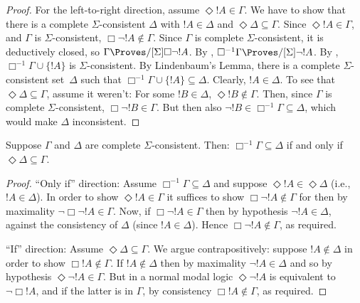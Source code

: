 \documentclass[../../../include/open-logic-section]{subfiles}
\begin{document}
{\begin{proof}
  For the left-to-right direction, assume $\Diamond !A \in \Gamma$. We
  have to show that there is a complete $\Sigma$-consistent $\Delta$
  with $!A \in \Delta$ and $\Diamond\Delta \subseteq \Gamma$.  Since
  $\Diamond !A \in \Gamma$, and $\Gamma$ is $\Sigma$-consistent,
  $\Box\lnot !A \notin \Gamma$. Since $\Gamma$ is complete
  $\Sigma$-consistent, it is deductively closed, so $\Gamma
  \Proves/[\Sigma] \Box\lnot !A$.  By ,
  $\Box^{-1}\Gamma \Proves/[\Sigma] \lnot !A$. By
  ,
  $\Box^{-1}\Gamma \cup \{ !A \}$ is $\Sigma$-consistent. By
  Lindenbaum's Lemma, there is a complete $\Sigma$-consistent
  set~$\Delta$ such that $\Box^{-1}\Gamma \cup \{ !A \} \subseteq
  \Delta$. Clearly, $!A \in \Delta$.  To see that $\Diamond\Delta
  \subseteq \Gamma$, assume it weren't: For some $!B \in \Delta$,
  $\Diamond !B \notin \Gamma$. Then, since $\Gamma$ is complete
  $\Sigma$-consistent, $\Box\lnot !B \in \Gamma$. But then also $\lnot
  !B \in \Box^{-1}\Gamma \subseteq \Delta$, which would make $\Delta$
  inconsistent.
\end{proof}
}

\begin{lem}
  Suppose $\Gamma$ and $\Delta$ are complete
  $\Sigma$-consistent. Then: $\Box^{-1}\Gamma \subseteq \Delta$ if and
  only if $\Diamond\Delta \subseteq \Gamma$.
\end{lem}

\begin{proof}
  ``Only if'' direction: Assume $\Box^{-1}\Gamma \subseteq \Delta$ and
  suppose $\Diamond!A \in \Diamond\Delta$ (i.e., $!A \in \Delta$).  In
  order to show $\Diamond!A \in \Gamma$ it suffices to show
  $\Box\lnot!A \notin \Gamma$ for then by maximality $\lnot\Box\lnot
  !A \in \Gamma$. Now, if $\Box\lnot!A \in \Gamma$ then by hypothesis
  $\lnot!A \in \Delta$, against the consistency of $\Delta$ (since $!A
  \in \Delta$). Hence $\Box\lnot!A \notin \Gamma$, as required.

  ``If'' direction: Assume $\Diamond\Delta
  \subseteq \Gamma$. We argue contrapositively: suppose $!A
  \notin \Delta$ in order to show $\Box!A \notin \Gamma$. If
  $!A \notin \Delta$ then by maximality $\lnot!A \in \Delta$
  and so by hypothesis $\Diamond\lnot!A \in \Gamma$. But in a
  normal modal logic $\Diamond\lnot!A$ is equivalent to
  $\lnot\Box !A$, and if the latter is in $\Gamma$, by consistency
  $\Box!A \notin\Gamma$, as required.
\end{proof}
\end{document}
